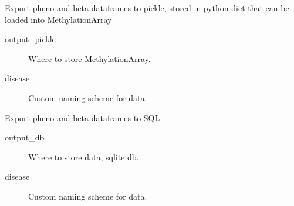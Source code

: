 \documentclass[letterpaper,10pt,english]{sphinxmanual}
\begin{document}
\begin{fulllineitems}
\begin{fulllineitems}
\begin{description}
\end{description}

\end{fulllineitems}


\begin{fulllineitems}
\label{\detokenize{index:pymethylprocess.PreProcessDataTypes.PreProcessIDAT.export_pickle}}
Export pheno and beta dataframes to pickle, stored in python dict that can be loaded into MethylationArray
\begin{description}
\item[{output\_pickle}] \leavevmode
Where to store MethylationArray.

\item[{disease}] \leavevmode
Custom naming scheme for data.

\end{description}

\end{fulllineitems}


\begin{fulllineitems}
\label{\detokenize{index:pymethylprocess.PreProcessDataTypes.PreProcessIDAT.export_sql}}
Export pheno and beta dataframes to SQL
\begin{description}
\item[{output\_db}] \leavevmode
Where to store data, sqlite db.

\item[{disease}] \leavevmode
Custom naming scheme for data.

\end{description}

\end{fulllineitems}



\end{fulllineitems}
\end{document}
